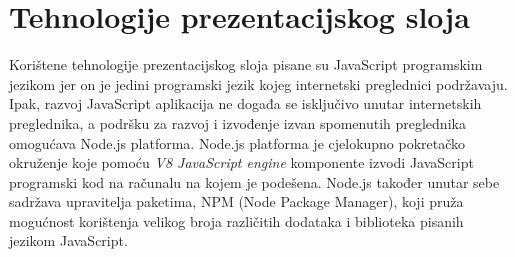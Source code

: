 \documentclass[times, utf8, zavrsni]{fer}
\begin{document}
		\section{Tehnologije prezentacijskog sloja}
		Korištene tehnologije prezentacijskog sloja pisane su JavaScript programskim jezikom jer on je jedini programski jezik kojeg internetski preglednici podržavaju. Ipak, razvoj JavaScript aplikacija ne događa se isključivo unutar internetskih preglednika, a podršku za razvoj i izvođenje izvan spomenutih preglednika omogućava Node.js platforma. Node.js platforma je cjelokupno pokretačko okruženje koje pomoću \textit{V8 JavaScript engine} komponente izvodi JavaScript programski kod na računalu na kojem je podešena. Node.js također unutar sebe sadržava upravitelja paketima, NPM (Node Package Manager), koji pruža mogućnost korištenja velikog broja različitih dodataka i biblioteka   pisanih jezikom JavaScript.
		
\end{document}
